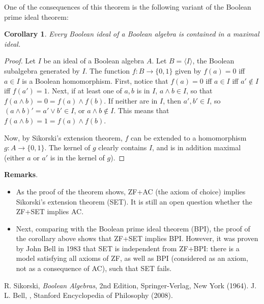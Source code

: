 \documentclass[12pt]{article}
\newtheorem{cor}{Corollary}
\begin{document}
One of the consequences of this theorem is the following variant of the Boolean prime ideal theorem:
\begin{cor}  Every Boolean ideal of a Boolean algebra is contained in a maximal ideal.
\end{cor}
\begin{proof}  Let $I$ be an ideal of a Boolean algebra $A$.  Let $B=\langle I\rangle$, the Boolean subalgebra generated by $I$.  The function $f:B \to \lbrace 0,1\rbrace$ given by $f(a)=0$ iff $a\in I$ is a Boolean homomorphism.  First, notice that $f(a)=0$ iff $a\in I$ iff $a'\notin I$ iff $f(a')=1$.  Next, if at least one of $a,b$ is in $I$, $a\wedge b\in I$, so that $f(a\wedge b)=0=f(a)\wedge f(b)$.  If neither are in $I$, then $a',b'\in I$, so $(a\wedge b)'= a'\vee b'\in I$, or $a\wedge b\notin I$.  This means that $f(a\wedge b)=1=f(a)\wedge f(b)$.

Now, by Sikorski's extension theorem, $f$ can be extended to a homomorphism $g: A\to \lbrace 0,1\rbrace$.  The kernel of $g$ clearly contains $I$, and is in addition maximal (either $a$ or $a'$ is in the kernel of $g$).
\end{proof}

\textbf{Remarks}.  
\begin{itemize}
\item
As the proof of the theorem shows, ZF+AC (the axiom of choice) implies Sikorski's extension theorem (SET).  It is still an open question whether the ZF+SET implies AC.  
\item
Next, comparing with the Boolean prime ideal theorem (BPI), the proof of the corollary above shows that ZF+SET implies BPI.  However, it was proven by John Bell in 1983 that SET is independent from ZF+BPI: there is a model satisfying all axioms of ZF, as well as BPI (considered as an axiom, not as a consequence of AC), such that SET fails.
\end{itemize}

\begin{thebibliography}{9}
 R. Sikorski, {\em Boolean Algebras}, 2nd Edition, Springer-Verlag, New York (1964).
 J. L. Bell, {\em {}}, Stanford Encyclopedia of Philosophy (2008).
\end{thebibliography}
\end{document}
